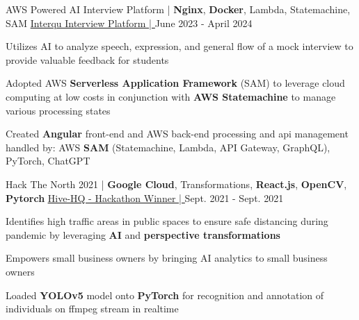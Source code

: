 \begin{cventries}
	\cventry
	{AWS Powered AI Interview Platform | \textbf{Nginx}, \textbf{Docker}, Lambda, Statemachine, SAM}
	{\underline{\href{https://github.com/Interqu}{Interqu Interview Platform | \ExternalLink}}} %
	{} %
	{June 2023 - April 2024} %
	{
		\begin{cvitems} %
			\item {Utilizes AI to analyze speech, expression, and general flow of a mock interview to provide valuable feedback for students}
      \item {Adopted AWS \textbf{Serverless Application Framework} (SAM) to leverage cloud computing at low costs in conjunction with \textbf{AWS Statemachine} to manage various processing states}
			\item {Created \textbf{Angular} front-end and AWS back-end processing and api management handled by: AWS \textbf{SAM} (Statemachine, Lambda, API Gateway, GraphQL), PyTorch, ChatGPT}
		\end{cvitems}
	}

	\cventry
	{Hack The North 2021 | \textbf{Google Cloud}, Transformations, \textbf{React.js}, \textbf{OpenCV}, \textbf{Pytorch}}
	{\underline{\href{https://devpost.com/software/hive-hq}{Hive-HQ - Hackathon Winner | \ExternalLink}}} %
	{} %
	{Sept. 2021 - Sept. 2021} %
	{
		\begin{cvitems} %
    \item {Identifies high traffic areas in public spaces to ensure safe distancing during pandemic by leveraging \textbf{AI} and \textbf{perspective transformations}}
			\item {Empowers small business owners by bringing AI analytics to small business owners}
			\item {Loaded \textbf{YOLOv5} model onto \textbf{PyTorch} for recognition and annotation of individuals on ffmpeg stream in realtime}
		\end{cvitems}
	}






\end{cventries}
